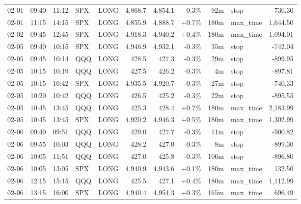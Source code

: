 \documentclass[11pt,a4paper,twoside]{article}
\begin{document}
\begin{center}
\begin{longtable}{>{\color{txtmain}}l l l l l r r r r >{\color{txtmain}}l r}
02-01 & 09:40 & 11:12 & SPX & LONG & 4,868.7 & 4,854.1 & \textcolor{lossred}{-0.3\%} & 92m & stop & \textcolor{lossred}{-730.30} \\
02-01 & 11:15 & 14:15 & SPX & LONG & 4,855.9 & 4,888.7 & \textcolor{wingreen}{+0.7\%} & 180m & max\_time & \textcolor{wingreen}{1,644.50} \\
02-02 & 09:45 & 12:45 & SPX & LONG & 4,918.3 & 4,940.2 & \textcolor{wingreen}{+0.4\%} & 180m & max\_time & \textcolor{wingreen}{1,094.01} \\
02-05 & 09:40 & 10:15 & SPX & LONG & 4,946.9 & 4,932.1 & \textcolor{lossred}{-0.3\%} & 35m & stop & \textcolor{lossred}{-742.04} \\
02-05 & 09:45 & 10:14 & QQQ & LONG & 428.5 & 427.3 & \textcolor{lossred}{-0.3\%} & 29m & stop & \textcolor{lossred}{-899.95} \\
02-05 & 10:15 & 10:19 & QQQ & LONG & 427.5 & 426.2 & \textcolor{lossred}{-0.3\%} & 4m & stop & \textcolor{lossred}{-897.81} \\
02-05 & 10:15 & 10:42 & SPX & LONG & 4,935.5 & 4,920.7 & \textcolor{lossred}{-0.3\%} & 27m & stop & \textcolor{lossred}{-740.33} \\
02-05 & 10:20 & 10:42 & QQQ & LONG & 426.5 & 425.2 & \textcolor{lossred}{-0.3\%} & 22m & stop & \textcolor{lossred}{-895.55} \\
02-05 & 10:45 & 13:45 & QQQ & LONG & 425.3 & 428.4 & \textcolor{wingreen}{+0.7\%} & 180m & max\_time & \textcolor{wingreen}{2,183.99} \\
02-05 & 10:45 & 13:45 & SPX & LONG & 4,920.2 & 4,946.3 & \textcolor{wingreen}{+0.5\%} & 180m & max\_time & \textcolor{wingreen}{1,302.99} \\
02-06 & 09:40 & 09:51 & QQQ & LONG & 429.0 & 427.7 & \textcolor{lossred}{-0.3\%} & 11m & stop & \textcolor{lossred}{-900.82} \\
02-06 & 09:55 & 10:03 & QQQ & LONG & 428.2 & 427.0 & \textcolor{lossred}{-0.3\%} & 8m & stop & \textcolor{lossred}{-899.30} \\
02-06 & 10:05 & 11:51 & QQQ & LONG & 427.0 & 425.8 & \textcolor{lossred}{-0.3\%} & 106m & stop & \textcolor{lossred}{-896.80} \\
02-06 & 10:05 & 13:05 & SPX & LONG & 4,940.9 & 4,943.6 & \textcolor{wingreen}{+0.1\%} & 180m & max\_time & \textcolor{wingreen}{132.50} \\
02-06 & 12:15 & 15:15 & QQQ & LONG & 425.5 & 427.1 & \textcolor{wingreen}{+0.4\%} & 180m & max\_time & \textcolor{wingreen}{1,112.99} \\
02-06 & 13:15 & 16:00 & SPX & LONG & 4,940.4 & 4,954.3 & \textcolor{wingreen}{+0.3\%} & 165m & max\_time & \textcolor{wingreen}{696.49} \\

\end{longtable}
\end{center}
\end{document}

